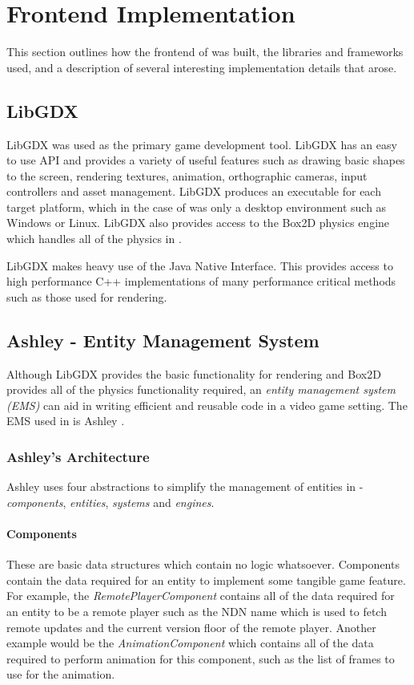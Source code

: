 \chapter{Frontend Implementation}
This section outlines how the frontend of \game{} was built, the libraries and frameworks used, and a description of several interesting implementation details that arose.

\section{LibGDX}
LibGDX \cite{libgdx} was used as the primary game development tool. LibGDX has an easy to use API and provides a variety of useful features such as drawing basic shapes to the screen, rendering textures, animation, orthographic cameras, input controllers and asset management. LibGDX produces an executable for each target platform, which in the case of \game{} was only a desktop environment such as Windows or Linux. LibGDX also provides access to the Box2D \cite{box2d} physics engine which handles all of the physics in \game{}. 

LibGDX makes heavy use of the Java Native Interface. This provides access to high performance C++ implementations of many performance critical methods such as those used for rendering. 


\section{Ashley - Entity Management System}\label{sec:impl:ashley}
Although LibGDX provides the basic functionality for rendering and Box2D provides all of the physics functionality required, an \textit{entity management system (EMS)} can aid in writing efficient and reusable code in a video game setting. The EMS used in \game{} is Ashley \cite{ashley}.

\subsection{Ashley's Architecture}
Ashley uses four abstractions to simplify the management of entities in \game{} - \textit{components}, \textit{entities}, \textit{systems} and \textit{engines}. 

\subsubsection{Components}
These are basic data structures which contain no logic whatsoever. Components contain the data required for an entity to implement some tangible game feature. For example, the \textit{RemotePlayerComponent} contains all of the data required for an entity to be a remote player such as the NDN name which is used to fetch remote updates and the current version floor of the remote player. Another example would be the \textit{AnimationComponent} which contains all of the data required to perform animation for this component, such as the list of frames to use for the animation. 

